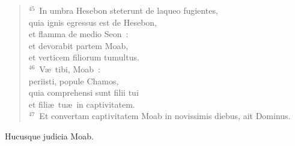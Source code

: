 \begin{flushleft}
\begin{verse}
${}^{45}$~In umbra Hesebon steterunt de laqueo fugientes,\\ quia ignis egressus est de Hesebon,\\ et flamma de medio Seon~:\\ et devorabit partem Moab,\\ et verticem filiorum tumultus.\\
${}^{46}$~V\ae\ tibi, Moab~:\\ periisti, popule Chamos,\\ quia comprehensi sunt filii tui\\ et fili\ae\ tu\ae\ in captivitatem.\\
${}^{47}$~Et convertam captivitatem Moab in novissimis diebus, ait Dominus.\end{verse}\end{flushleft}

 Hucusque judicia Moab.

